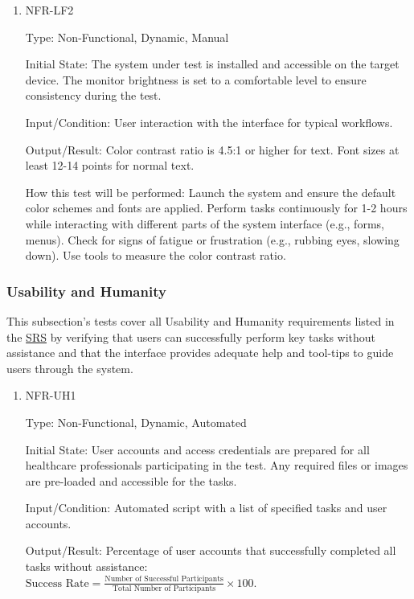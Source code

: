 \documentclass[12pt, titlepage]{article}
\begin{document}
\begin{enumerate}
\begin{enumerate}
\item{NFR-LF2}\label{NFR-LF2}

Type: Non-Functional, Dynamic, Manual

Initial State: The system under test is installed and accessible on the target device. The monitor brightness is set to a comfortable level to ensure consistency during the test.

Input/Condition: User interaction with the interface for typical workflows.

Output/Result: Color contrast ratio is 4.5:1 or higher for text. Font sizes at least 12-14 points for normal text.

How this test will be performed: Launch the system and ensure the default color schemes and fonts are applied. Perform tasks continuously for 1-2 hours while interacting with different parts of the system interface (e.g., forms, menus). Check for signs of fatigue or frustration (e.g., rubbing eyes, slowing down). Use tools to measure the color contrast ratio.

\end{enumerate}

\subsubsection{Usability and Humanity}

This subsection's tests cover all Usability and Humanity requirements listed in the \href{https://github.com/RezaJodeiri/CXR-Capstone/blob/main/docs/SRS/SRS.pdf}{SRS} \citep{SRS}
 by verifying that users can successfully perform key tasks without assistance and that the interface provides adequate help and tool-tips to guide users through the system.

\begin{enumerate}

\item{NFR-UH1}\label{NFR-UH1}

Type: Non-Functional, Dynamic, Automated

Initial State: User accounts and access credentials are prepared for all healthcare professionals participating in the test. Any required files or images are pre-loaded and accessible for the tasks.

Input/Condition: Automated script with a list of specified tasks and user accounts.

Output/Result: Percentage of user accounts that successfully completed all tasks without assistance: \\$\text{Success Rate} = \frac{\text{Number of Successful Participants}}{\text{Total Number of Participants}} \times 100$.\\


\end{enumerate}
\end{enumerate}
\end{document}
